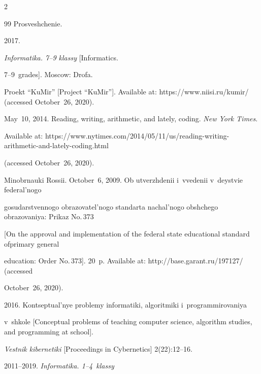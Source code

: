 \begin{multicols}{2}
{{\begin{thebibliography}{99}
Prosveshchenie. 







 2017. 


\textit{Informatika. 7--9 klassy} [Informatics.  


7--9~grades]. Moscow: Drofa. 







Proekt ``KuMir'' [Project ``KuMir'']. Available at: {\sf https://www.niisi.ru/kumir/} (accessed October~26, 2020).




 May~10, 2014. Reading, writing, arithmetic, and lately, coding. \textit{New York Times}. 


Available at: {\sf https://www.nytimes.com/2014/05/11/us/reading-writing-arithmetic-and-lately-coding.html} 


(accessed October~26, 2020).




Minobrnauki Rossii. October~6, 2009. Ob utverzhdenii i~vvedenii v~deystvie federal'nogo 


gosudarstvennogo obrazovatel'nogo standarta nachal'nogo obshchego obrazovaniya: Prikaz No.\,373 


[On the approval and implementation of the federal state educational standard of\linebreak primary general 


education: Order No.\,373]. 20~p. Available at: {\sf http://base.garant.ru/197127/} (accessed 


October~26, 2020).




 2016. Kontseptual'nye problemy informatiki, algoritmiki i~programmirovaniya 


v~shkole [Conceptual problems of teaching computer science, algorithm studies, and programming at school]. 


\textit{Vestnik kibernetiki} [Proceedings in Cybernetics] 2(22):12--16.




 2011--2019. \textit{Informatika. 1--4~klassy}



\end{thebibliography}}}
\end{multicols}
